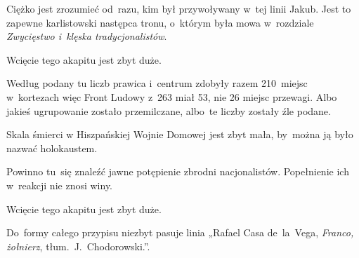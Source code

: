 \documentclass[a4paper,11pt]{article}
\begin{document}
\vspace{\spaceFour}





\noindent
{} Ciężko jest zrozumieć od~razu, kim był przywoływany w~tej
linii Jakub. Jest to zapewne karlistowski następca tronu, o~którym była
mowa w~rozdziale \textit{Zwycięstwo i~klęska   tradycjonalistów}.

\vspace{\spaceFour}





\noindent
{} Wcięcie tego akapitu jest zbyt duże.

\vspace{\spaceFour}





\noindent
{} Według podany tu liczb prawica i~centrum zdobyły razem 210~miejsc
w~kortezach więc Front Ludowy z~263 miał 53, nie 26 miejsc przewagi. Albo
jakieś ugrupowanie zostało przemilczane, albo~te liczby zostały źle podane.

\vspace{\spaceFour}





\noindent
{} Skala śmierci w Hiszpańskiej Wojnie Domowej jest zbyt mała,
by~można ją było nazwać holokaustem.

\vspace{\spaceFour}





\noindent
{} Powinno tu~się znaleźć jawne potępienie zbrodni
nacjonalistów. Popełnienie ich w~reakcji nie znosi winy.

\vspace{\spaceFour}





\noindent
{} Wcięcie tego akapitu jest zbyt duże.

\vspace{\spaceFour}





\noindent
{} Do~formy całego przypisu niezbyt pasuje linia „Rafael Casa
de~la~Vega, \textit{Franco, żołnierz}, tłum.~J.~Chodorowski.”.
\end{document}
